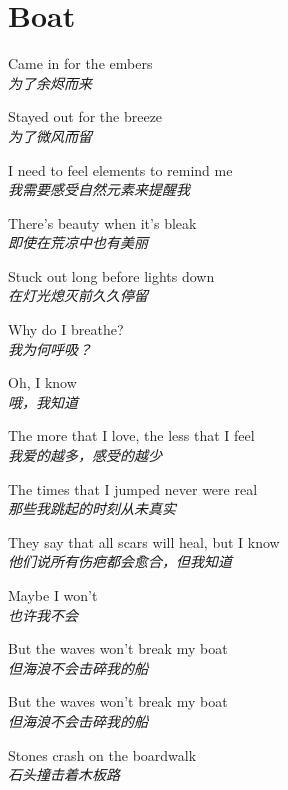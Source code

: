 \section{Boat}

\thispagestyle{empty}


\begin{spacing}{1.5}
\begin{flushleft}
Came in for the embers\\
\textit{为了余烬而来}\lyricspace

Stayed out for the breeze\\
\textit{为了微风而留}\lyricspace

I need to feel elements to remind me\\
\textit{我需要感受自然元素来提醒我}\lyricspace

There's beauty when it's bleak\\
\textit{即使在荒凉中也有美丽}\lyricspace

Stuck out long before lights down\\
\textit{在灯光熄灭前久久停留}\lyricspace

Why do I breathe?\\
\textit{我为何呼吸？}\lyricspace

Oh, I know\\
\textit{哦，我知道}\lyricspace

The more that I love, the less that I feel\\
\textit{我爱的越多，感受的越少}\lyricspace

The times that I jumped never were real\\
\textit{那些我跳起的时刻从未真实}\lyricspace

They say that all scars will heal, but I know\\
\textit{他们说所有伤疤都会愈合，但我知道}\lyricspace

Maybe I won't\\
\textit{也许我不会}\lyricspace

But the waves won't break my boat\\
\textit{但海浪不会击碎我的船}\lyricspace

But the waves won't break my boat\\
\textit{但海浪不会击碎我的船}\lyricspace

Stones crash on the boardwalk\\
\textit{石头撞击着木板路}\lyricspace


\end{flushleft}
\end{spacing}
